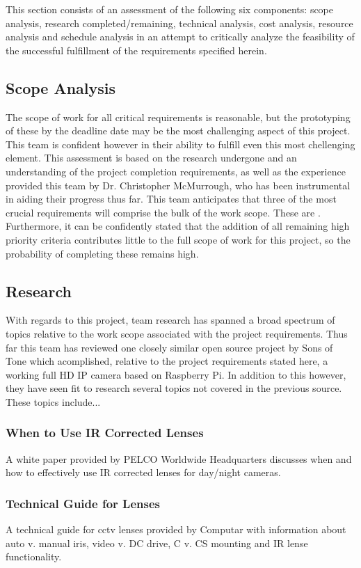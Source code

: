 This section consists of an assessment of the following six components: scope analysis, research completed/remaining, technical analysis, cost analysis, resource analysis and schedule analysis in an attempt to critically analyze the feasibility of the successful fulfillment of the requirements specified herein.

\subsection{Scope Analysis}
The scope of work for all critical requirements is reasonable, but the prototyping of these by the deadline date may be the most challenging aspect of this project. This team is confident however in their ability to fulfill even this most chellenging element. This assessment is based on the research undergone and an understanding of the project completion requirements, as well as the experience provided this team by Dr. Christopher McMurrough, who has been instrumental in aiding their progress thus far. This team anticipates that three of the most crucial requirements will comprise the bulk of the work scope. These are{ }. Furthermore, it can be confidently stated that the addition of all remaining high priority criteria contributes little to the full scope of work for this project, so the probability of completing these remains high.

\subsection{Research}
With regards to this project, team research has spanned a broad spectrum of topics relative to the work scope associated with the project requirements. Thus far this team has reviewed one closely similar open source project by Sons of Tone which acomplished, relative to the project requirements stated here, a working full HD IP camera based on Raspberry Pi. In addition to this however, they have seen fit to research several topics not covered in the previous source. These topics include...

\subsubsection{When to Use IR Corrected Lenses}
A white paper provided by PELCO Worldwide Headquarters discusses when and how to effectively use IR corrected lenses for day/night cameras.

\subsubsection{Technical Guide for Lenses}
A technical guide for cctv lenses provided by Computar with information about auto v. manual iris, video v. DC drive, C v. CS mounting and IR lense functionality.

